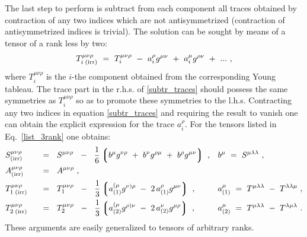 \documentclass[12pt,preprintnumbers,nofootinbib]{revtex4}
\begin{document}
	The last step to perform is subtract from each component
	all traces obtained by contraction of any two indices which
	are not antisymmetrized (contraction of antisymmetrized indices is
	trivial).
	The solution can be sought by means of a tensor of a rank less by two:
\begin{equation}
\label{subtr_traces}
	T_{i\;{\rm (irr)}}^{\mu\nu\rho} ~=~
	T_i^{\mu\nu\rho}  ~-~  a_i^{\rho}g^{\mu\nu} 
			  ~+~  a_i^{\mu}g^{\rho\nu} ~+~ ...~,
\end{equation}
	where $ T_i^{\mu\nu\rho} $ is the $ i $-the component
	obtained from the corresponding Young tableau.
	The trace part in the r.h.s. of \eqref{subtr_traces} should 
	possess the same symmetries as $ T_i^{\mu\nu\rho} $
	so as to promote these symmetries to the l.h.s.
	Contracting any two indices in equation \eqref{subtr_traces} and
	requiring the result to vanish one can obtain the explicit expression
	for the trace $ a_i^{\rho} $.
	For the tensors listed in Eq.~\eqref{list_3rank} one obtains:
\begin{align}
\label{irr_3rank}
\notag
	& S^{\mu\nu\rho}_{\rm (irr)} && ~~=~~
		S^{\mu\nu\rho} ~~-~~ \frac{1}{6} 
		\left\lgroup b^\mu g^{\nu\rho} ~+~ b^\nu g^{\rho\mu} ~+~ b^\rho g^{\mu\nu} \right\rgroup
		~,
		&&
		b^\mu ~=~ S^{\mu\lambda\lambda}~,
	\\
	& A^{\mu\nu\rho}_{\rm (irr)} && ~~=~~ A^{\mu\nu\rho}~, 
	\\
\notag
	& T^{\mu\nu\rho}_{1\;\rm (irr)} && ~~=~~
		T_1^{\mu\nu\rho}   ~~-~~
		\frac{1}{3} \left\lgroup  a_{(1)}^{(\mu} g^{\nu)\rho} ~-~
				    2\, a_{(1)}^\rho g^{\mu\nu} 
			    \right\rgroup~,
		&&
		a_{(1)}^\mu ~=~ T^{\mu\lambda\lambda} ~-~ T^{\lambda\lambda\mu}~,
	\\
\notag
	& T^{\mu\nu\rho}_{2\;\rm (irr)} && ~~=~~
		T_2^{\mu\nu\rho}   ~~-~~
		\frac{1}{3} \left\lgroup  a_{(2)}^{(\mu} g^{\rho)\nu} ~-~
				    2\, a_{(2)}^\nu g^{\mu\rho} 
			    \right\rgroup~,
		&&
		a_{(2)}^\mu ~=~ T^{\mu\lambda\lambda} ~-~ T^{\lambda\mu\lambda}
	~.
\end{align}
	These arguments are easily generalized to tensors of arbitrary ranks.

	



	
\end{document}
